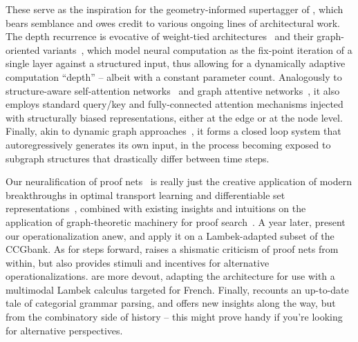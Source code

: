 These serve as the inspiration for the geometry-informed supertagger of \citet{kogkalidis2022geometryaware}, which bears semblance and owes credit to various ongoing lines of architectural work.
The depth recurrence is evocative of weight-tied architectures~\cite{dehghani2018universal,bai2019deep} and their graph-oriented variants~\cite{li2016gated}, which model neural computation as the fix-point iteration of a single layer against a structured input, thus allowing for a dynamically adaptive computation ``depth'' -- albeit with a constant parameter count.
Analogously to structure-aware self-attention networks~\cite[inter alia]{zhu-etal-2019-modeling,cai2020graph} and graph attentive networks~\cite[inter alia]{velivckovic2018graph,yun2019graph,ying2021transformers,brody2021attentive}, it also employs standard query/key and fully-connected attention mechanisms injected with structurally biased representations, either at the edge or at the node level.
Finally, akin to dynamic graph approaches~\cite{liao2019efficient,pareja2020evolvegcn}, it forms a closed loop system that autoregressively generates its own input, in the process becoming exposed to subgraph structures that drastically differ between time steps.

Our neuralification of proof nets~\cite{kogkalidis-etal-2020-neural} is really just the creative application of modern breakthroughs in optimal transport learning and differentiable set representations~\cite[inter alia]{cuturi2013sinkhorn,mena2018learning,grover2018stochastic,peyre2019computational}, combined with existing insights and intuitions on the application of graph-theoretic machinery for proof search~\cite{moot2008graph}.
A year later, \citet{bhargava2021proof} present our operationalization anew, and apply it on a Lambek-adapted subset of the CCGbank.
As for steps forward, \citet{moot2022perspectives} raises a shismatic criticism of proof nets from within, but also provides stimuli and incentives for alternative operationalizations.
 are more devout, adapting the architecture for use with a multimodal Lambek calculus targeted for French. 
Finally, \citet{DBLP:journals/corr/abs-2109-10044} recounts an up-to-date tale of categorial grammar parsing, and offers new insights along the way, but from the combinatory side of history -- this might prove handy if you're looking for alternative perspectives.




